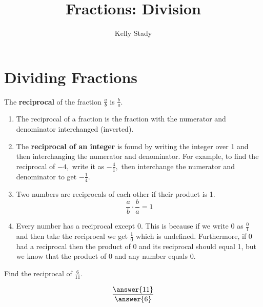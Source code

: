 \documentclass{ximera}[font=12pt]
\title{Fractions: Division}   %
\author{Kelly Stady}
\begin{document}
   

\begin{abstract}

\end{abstract}

\maketitle

\label{xim:FractionsDivision}


\section*{Dividing Fractions}


\begin{definition}

The \textbf{reciprocal} of the fraction $\displaystyle \frac{a}{b}$ is $\displaystyle \frac{b}{a}.$
\end{definition}


\begin{remark}

\begin{enumerate}
\item  The reciprocal of a fraction is the fraction with the numerator and
denominator interchanged (inverted).

\item The \textbf{reciprocal of an integer} is found by writing the integer over 1 and then interchanging 
the numerator and denominator. For example, to find the reciprocal of $-4,$ write it as $-\frac{4}{1},$
then interchange the numerator and denominator to get $-\frac{1}{4}.$

\item Two numbers are reciprocals of each other if their product is 1.
\[ \frac{a}{b} \cdot \frac{b}{a} = 1 \]

\item Every number has a reciprocal except 0.  This is because if we write 0 as $\frac{0}{1}$
and then take the reciprocal we get $\frac{1}{0}$ which is undefined.  Furthermore, if 0 had a reciprocal
then the product of 0 and its reciprocal should equal 1, but we know that the product of 0 and any number equals 0.
\end{enumerate}

\end{remark}

\begin{problem}
Find the reciprocal of $\displaystyle \frac{6}{11}.$

\[ \frac{\answer{11}}{\answer{6}} \] 

\end{problem}
\end{document}
